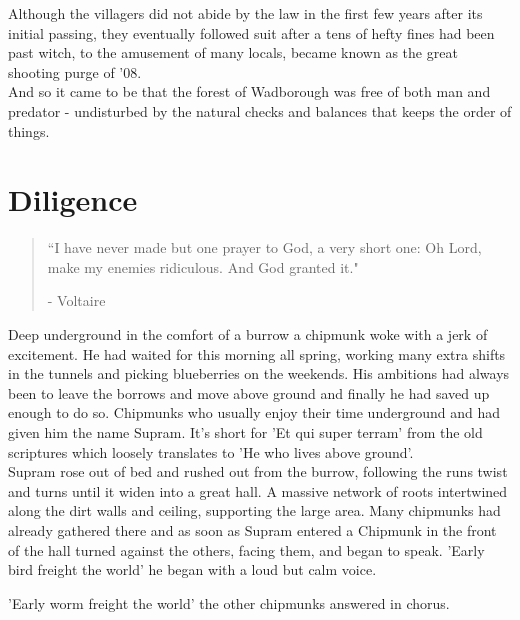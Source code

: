 \documentclass[smalldemyvopaper,11pt,twoside,onecolumn,openright,extrafontsizes]{memoir}
\begin{document}
Although the villagers did not abide by the law in the first few years after its initial passing, they eventually followed suit after a tens of hefty fines had been past witch, to the amusement of many locals, became known as the great shooting purge of '08.\\

And so it came to be that the forest of Wadborough was free of both man and predator - undisturbed by the natural checks and balances that keeps the order of things.

\chapter{Diligence}

\vspace{-1.3cm}
\begin{localsize}{10}
	\begin{quote}
		“I have never made but one prayer to God, a very short one: Oh Lord, make my enemies ridiculous. And God granted it."
		\begin{flushright}- Voltaire \end{flushright}
	\end{quote}
\end{localsize}
\vspace{1cm}

Deep underground in the comfort of a burrow	a chipmunk woke with a jerk of excitement. He had waited for this morning all spring, working many extra shifts in the tunnels and picking blueberries on the weekends. His ambitions had always been to leave the borrows and move above ground and finally he had saved up enough to do so. Chipmunks who usually enjoy their time underground and had given him the name Supram. It's short for 'Et qui super terram' from the old scriptures which loosely translates to 'He who lives above ground'.\\

Supram rose out of bed and rushed out from the burrow, following the runs twist and turns until it widen into a great hall. A massive network of roots intertwined along the dirt walls and ceiling, supporting the large area. Many chipmunks had already gathered there and as soon as Supram entered a Chipmunk in the front of the hall turned against the others, facing them, and began to speak. 
'Early bird freight the world' he began with a loud but calm voice. 

'Early worm freight the world' the other chipmunks answered in chorus.
\end{document}
